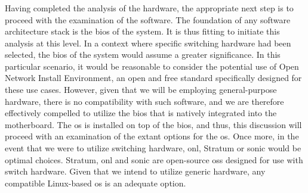 \subsubsection{}
Having completed the analysis of the hardware, the appropriate next step is to proceed with the examination of the software. The foundation of any software architecture stack is the \gls{bios} of the system. It is thus fitting to initiate this analysis at this level. In a context where specific switching hardware had been selected, the \gls{bios} of the system would assume a greater significance. In this particular scenario, it would be reasonable to consider the potential use of Open Network Install Environment\cite{noauthor_deploy_nodate}, an open and free standard specifically designed for these use cases. However, given that we will be employing general-purpose hardware, there is no compatibility with such software, and we are therefore effectively compelled to utilize the \gls{bios} that is natively integrated into the motherboard.
The \gls{os} is installed on top of the \gls{bios}, and thus, this discussion will proceed with an examination of the extant options for the \gls{os}. Once more, in the event that we were to utilize switching hardware, \gls{onl}, Stratum or \gls{sonic} would be optimal choices. Stratum, \gls{onl} and \gls{sonic} are open-source \glspl{os} designed for use with switch hardware. Given that we intend to utilize generic hardware, any compatible Linux-based \gls{os} is an adequate option.

